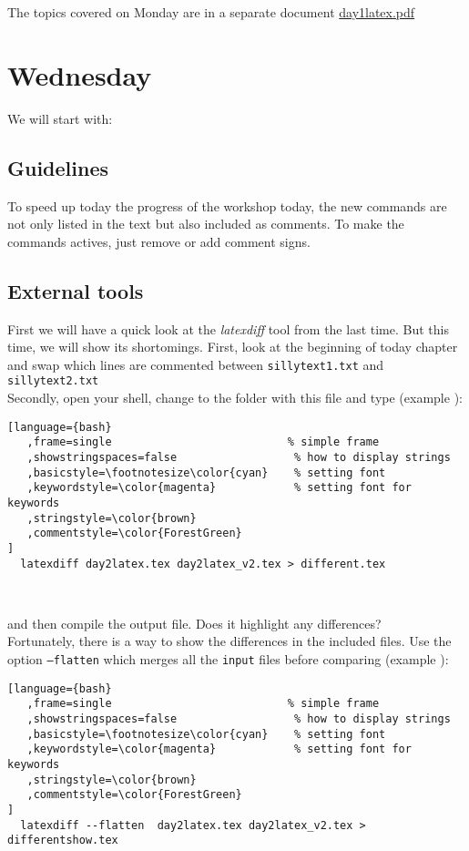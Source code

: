 \documentclass[a4paper,10pt]{report} %
\newcounter{samplecode}[chapter]
\begin{document}
 The topics covered on Monday are in a separate document \href{./day1latex.pdf}{day1latex.pdf}

 \newpage 
 
  
\chapter{Wednesday} \label{chap:wednesday}

 

We will start with:
  
%

\section{Guidelines}
To speed up today the progress of the workshop today, the new commands are not only listed in the text but also included as comments. To make the commands actives, just remove or add comment signs.

\section{External tools}
First we will have a quick look at the \emph{latexdiff} tool from the last time.
But this time, we will  show its shortomings. First, look at the beginning of today chapter and swap which lines are commented between  \texttt{sillytext1.txt} and \texttt{sillytext2.txt}\\

Secondly, open your shell, change to the folder with this file and type  (example ): 

\begin{lstlisting}[language={bash}
   ,frame=single                           % simple frame 
   ,showstringspaces=false                  % how to display strings
   ,basicstyle=\footnotesize\color{cyan}    % setting font
   ,keywordstyle=\color{magenta}            % setting font for keywords 
   ,stringstyle=\color{brown}
   ,commentstyle=\color{ForestGreen} 
]
  latexdiff day2latex.tex day2latex_v2.tex > different.tex
\end{lstlisting}~\vspace{1ex}

and then compile the output file. Does it highlight any differences?\\

Fortunately, there is a way to show the differences in the included files. Use the option \texttt{--flatten} which merges all the \texttt{input} files before comparing  (example ):
\begin{lstlisting}[language={bash}
   ,frame=single                           % simple frame 
   ,showstringspaces=false                  % how to display strings
   ,basicstyle=\footnotesize\color{cyan}    % setting font
   ,keywordstyle=\color{magenta}            % setting font for keywords 
   ,stringstyle=\color{brown}
   ,commentstyle=\color{ForestGreen} 
]
  latexdiff --flatten  day2latex.tex day2latex_v2.tex > differentshow.tex
\end{lstlisting}~\vspace{1ex}
\end{document}
